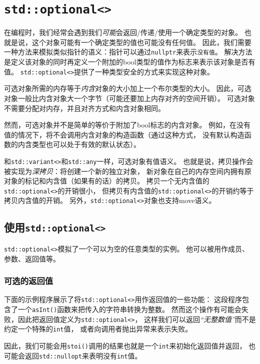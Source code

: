 \section{\texttt{std::optional<>}}\label{ch15}
在编程时，我们经常会遇到我们\emph{可能}会返回/传递/使用一个确定类型的对象。
也就是说，这个对象可能有一个确定类型的值也可能没有任何值。
因此，我们需要一种方法来模拟类似指针的语义：指针可以通过\texttt{nullptr}来表示\texttt{没有值}。
解决方法是定义该对象的同时再定义一个附加的bool类型的值作为标志来表示该对象是否有值。
\texttt{std::optional<>}提供了一种类型安全的方式来实现这种对象。

可选对象所需的内存等于\emph{内含}对象的大小加上一个布尔类型的大小。
因此，可选对象一般比内含对象大一个字节（可能还要加上内存对齐的空间开销）。
可选对象不需要分配对内存，并且对齐方式和内含对象相同。

然而，可选对象并不是简单的等价于附加了bool标志的内含对象。
例如，在没有值的情况下，将不会调用内含对象的构造函数（通过这种方式，
没有默认构造函数的内含类型也可以处于有效的默认状态）。

和\texttt{std::variant<>}和\texttt{std::any}一样，可选对象有值语义。
也就是说，拷贝操作会被实现为\emph{深拷贝}：将创建一个新的独立对象，
新对象在自己的内存空间内拥有原对象的标记和内含值（如果有的话）的拷贝。
拷贝一个无内含值的\texttt{std::optional<>}的开销很小，
但拷贝有内含值的\texttt{std::optional<>}的开销约等于拷贝内含值的开销。
另外，\texttt{std::optional<>}对象也支持move语义。

\subsection{使用\texttt{std::optional<>}}
\texttt{std::optional<>}模拟了一个可以为空的任意类型的实例。
他可以被用作成员、参数、返回值等。

\subsubsection{可选的返回值}\label{ch15.1.1}
下面的示例程序展示了将\texttt{std::optional<>}用作返回值的一些功能：
这段程序包含了一个\texttt{asInt()}函数来把传入的字符串转换为整数。
然而这个操作有可能会失败，因此把返回值定义为\texttt{std::optional<>}，
这样我们可以返回\emph{“无整数值”}而不是约定一个特殊的\texttt{int}值，
或者向调用者抛出异常来表示失败。

因此，我们可能会用\texttt{stoi()}调用的结果也就是一个\texttt{int}来初始化返回值并返回，
也可能会返回\texttt{std::nullopt}来表明没有\texttt{int}值。

